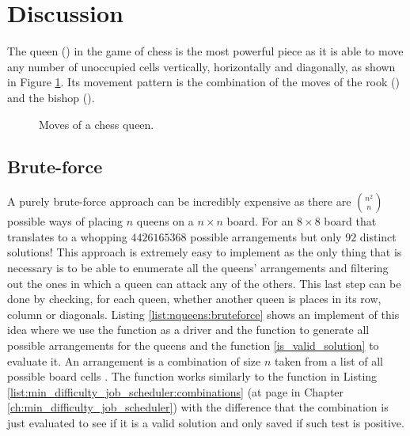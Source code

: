 \section{Discussion}
\label{nqueens:sec:discussion}
The queen (\symqueen) in the game of chess is the most powerful piece as it is able to move any
number of unoccupied cells vertically, horizontally and diagonally, as shown in Figure
\ref{fig:nqueens:queen_movements}. Its movement pattern is the combination of the moves of the rook
(\symrook) and the bishop (\symbishop).

\begin{figure}
	\centering 
	\def\myfen{8/8/8/8/8/3q3/8/8 w - - 0 1} \chessboard[setfen=\myfen, pgfstyle=straightmove,
	arrow=stealth, linewidth=.3ex, padding=2ex, color=black!75!white, shortenstart=1.15ex,
	showmover=false, markmoves={d3-h7,d3-a6,d3-b1,d3-f1,d3-d8,d3-d1,d3-a3,d3-h3}] 
	\caption{Moves of a chess queen.}
	 \label{fig:nqueens:queen_movements}
\end{figure}



\subsection{Brute-force}
\label{nqueens:sec:bruteforce}

A purely brute-force approach can be incredibly expensive as there are ${n^2 \choose n}$ possible
ways of placing $n$ queens on a $n \times n$ board. For an $8 \times 8$ board that translates to a
whopping $4426165368$ possible arrangements but only $92$ distinct solutions! This approach is
extremely easy to implement as the only thing that is necessary is to be able to enumerate all the
queens' arrangements and filtering out the ones in which a queen can attack any of the others. This
last step can be done by checking, for each queen, whether another queen is places in its row,
column or diagonals. Listing \ref{list:nqueens:bruteforce} shows an implement of this idea where we
use the function  as a driver and the function
 to generate all possible arrangements for the queens and the
function \ref{is_valid_solution} to evaluate it. An arrangement is a combination of size $n$ taken
from a list of all possible board cells . The function
 works similarly to the function  in
Listing \ref{list:min_difficulty_job_scheduler:combinations} (at page
\pageref{list:min_difficulty_job_scheduler:combinations} in Chapter
\ref{ch:min_difficulty_job_scheduler}) with the difference that the combination is just evaluated to
see if it is a valid solution and only saved if such test is positive.

